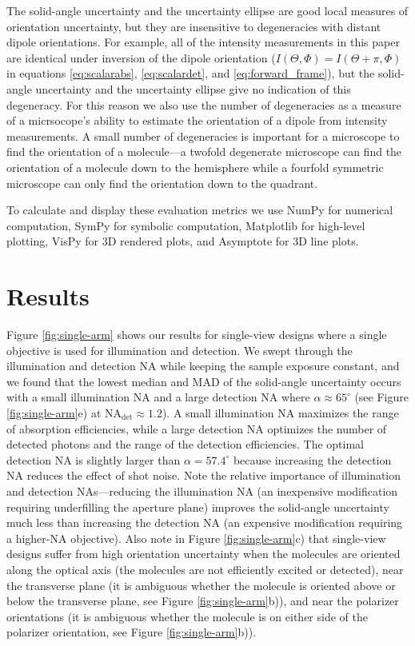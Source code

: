 \documentclass[10pt]{article}
\begin{document}
The solid-angle uncertainty and the uncertainty ellipse are good local measures
of orientation uncertainty, but they are insensitive to degeneracies with
distant dipole orientations. For example, all of the intensity measurements in
this paper are identical under inversion of the dipole orientation
($I(\Theta, \Phi) = I(\Theta + \pi, \Phi)$ in equations \ref{eq:scalarabs},
\ref{eq:scalardet}, and \ref{eq:forward_frame}), but the solid-angle uncertainty
and the uncertainty ellipse give no indication of this degeneracy. For this
reason we also use the number of degeneracies as a measure of a micrsocope's
ability to estimate the orientation of a dipole from intensity measurements. A
small number of degeneracies is important for a microscope to find the
orientation of a molecule---a twofold degenerate microscope can find the
orientation of a molecule down to the hemisphere while a fourfold symmetric
microscope can only find the orientation down to the quadrant.

To calculate and display these evaluation metrics we use NumPy \cite{walt2011}
for numerical computation, SymPy \cite{meurer2017} for symbolic computation,
Matplotlib \cite{hunter2007} for high-level plotting, VisPy \cite{vispy} for 3D
rendered plots, and Asymptote \cite{bowman2008} for 3D line plots.

\section{Results}\label{results}
Figure \ref{fig:single-arm} shows our results for single-view designs where a
single objective is used for illumination and detection. We swept through the
illumination and detection NA while keeping the sample exposure constant, and we
found that the lowest median and MAD of the solid-angle uncertainty occurs with
a small illumination NA and a large detection NA where
$\alpha \approx 65^{\circ}$ (see Figure \ref{fig:single-arm}e) at
NA${}_{\text{det}} \approx 1.2$). A small illumination NA maximizes the range of
absorption efficiencies, while a large detection NA optimizes the number of
detected photons and the range of the detection efficiencies. The optimal
detection NA is slightly larger than $\alpha = 57.4^{\circ}$ because increasing
the detection NA reduces the effect of shot noise. Note the relative importance
of illumination and detection NAs---reducing the illumination NA (an inexpensive
modification requiring underfilling the aperture plane) improves the solid-angle
uncertainty much less than increasing the detection NA (an expensive
modification requiring a higher-NA objective). Also note in Figure
\ref{fig:single-arm}c) that single-view designs suffer from high orientation
uncertainty when the molecules are oriented along the optical axis (the
molecules are not efficiently excited or detected), near the transverse plane
(it is ambiguous whether the molecule is oriented above or below the transverse
plane, see Figure \ref{fig:single-arm}b)), and near the polarizer orientations
(it is ambiguous whether the molecule is on either side of the polarizer
orientation, see Figure \ref{fig:single-arm}b)).
\end{document}
